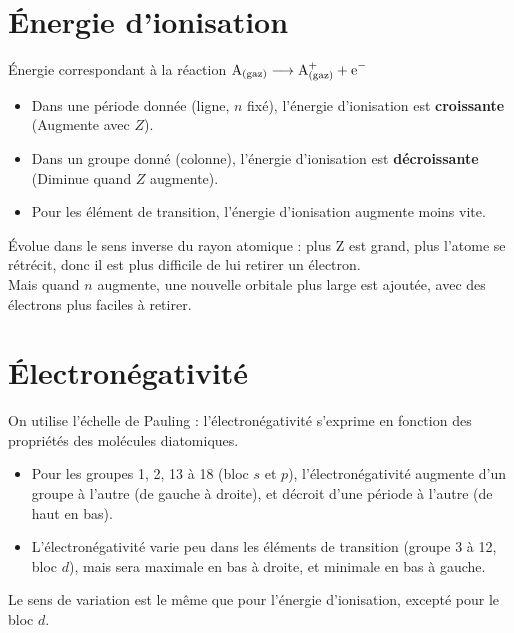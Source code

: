 \documentclass[13pt, twoside, a4paper, french, tikz]{report}
\begin{document}
    \section{Énergie d'ionisation}\label{sec:energie-d'ionisation}

    Énergie correspondant à la réaction $\ce{A_{(gaz)}} \longrightarrow \ce{A^+_{(gaz)}} + \ce{e^-}$

    \begin{itemize}
        \item Dans une période donnée (ligne, $n$ fixé), l'énergie d'ionisation est \textbf{croissante} (Augmente avec $Z$).
        \item Dans un groupe donné (colonne), l'énergie d'ionisation est \textbf{décroissante} (Diminue quand $Z$ augmente).
        \item Pour les élément de transition, l'énergie d'ionisation augmente moins vite.
    \end{itemize}
    \vspace{7pt}

    Évolue dans le sens inverse du rayon atomique : plus Z est grand, plus l'atome se rétrécit, donc il est plus difficile de lui retirer un électron.\\
    Mais quand $n$ augmente, une nouvelle orbitale plus large est ajoutée, avec des électrons plus faciles à retirer.


    \section{Électronégativité}\label{sec:electronegativite}

    On utilise l'échelle de Pauling : l'électronégativité s'exprime en fonction des propriétés des molécules diatomiques.

    \begin{itemize}
        \item Pour les groupes 1, 2, 13 à 18 (bloc $s$ et $p$), l'électronégativité augmente d'un groupe à l'autre (de gauche à droite), et décroit d'une période à l'autre (de haut en bas).
        \item L'électronégativité varie peu dans les éléments de transition (groupe 3 à 12, bloc $d$), mais sera maximale en bas à droite, et minimale en bas à gauche.
    \end{itemize}
    \vspace{7pt}

    Le sens de variation est le même que pour l'énergie d'ionisation, excepté pour le bloc $d$.\\
\end{document}
